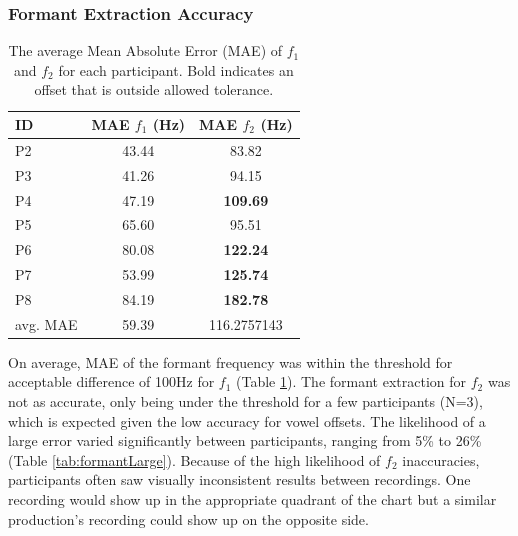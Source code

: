 \subsubsection{Formant Extraction Accuracy}
\begin{table}[t]
    \begin{tabular}{l|cc}
    ID & MAE $f_1$ (Hz) & MAE $f_2$ (Hz) \\
    \hline
    P2              & 43.44                     & 83.82                        \\
    P3              & 41.26                     & 94.15                        \\
    P4              & 47.19                     & \textbf{109.69}                       \\
    P5              & 65.60                     & 95.51                        \\
    P6              & 80.08                     & \textbf{122.24}                       \\
    P7              & 53.99                     & \textbf{125.74}                       \\
    P8              & 84.19                     & \textbf{182.78}                       \\
    \hline
    avg. MAE        & 59.39                     & 116.2757143
    \end{tabular}
    \caption{The average Mean Absolute Error (MAE) of $f_1$ and $f_2$ for each participant. Bold indicates an offset that is outside allowed tolerance.}
    \label{tab:MAEformant}
\end{table}

On average, MAE of the formant frequency was within the threshold for acceptable difference of 100Hz for $f_1$ (Table \ref{tab:MAEformant}). The formant extraction for $f_2$ was not as accurate, only being under the threshold for a few participants (N=3), which is expected given the low accuracy for vowel offsets. The likelihood of a large error varied significantly between participants, ranging from 5\% to 26\% (Table \ref{tab:formantLarge}). Because of the high likelihood of $f_2$ inaccuracies, participants often saw visually inconsistent results between recordings. One recording would show up in the appropriate quadrant of the chart but a similar production's recording could show up on the opposite side. 

